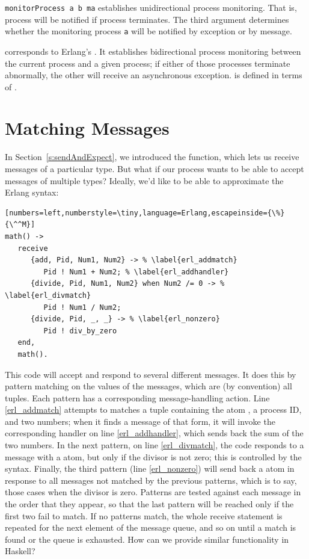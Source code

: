 \documentclass[preprint]{sigplanconf}
\begin{document}
\noindent
\lstinline!monitorProcess a b ma! establishes unidirectional process monitoring. That is, process  will be notified if process  terminates. The third argument determines whether the monitoring process \texttt{a} will be notified by exception or by message.

 corresponds to Erlang's . It establishes bidirectional process monitoring between the current process and a given process; if either of those processes terminate abnormally, the other will receive an asynchronous exception.  is defined in terms of . 

\section{Matching Messages}
\label{s:matching}

In Section~\ref{s:sendAndExpect}, we introduced the  function, which lets us receive messages of a particular type. But what if our process wants to be able to accept messages of multiple types? Ideally, we'd like to be able to approximate the Erlang  syntax:
\needspace{10ex}
\begin{lstlisting}[numbers=left,numberstyle=\tiny,language=Erlang,escapeinside={\%}{\^^M}]
math() ->
   receive
      {add, Pid, Num1, Num2} -> % \label{erl_addmatch}
         Pid ! Num1 + Num2; % \label{erl_addhandler}
      {divide, Pid, Num1, Num2} when Num2 /= 0 -> % \label{erl_divmatch}
         Pid ! Num1 / Num2;
      {divide, Pid, _, _} -> % \label{erl_nonzero}
         Pid ! div_by_zero
   end,
   math().
\end{lstlisting}
\label{erl_math}

This code will accept and respond to several different messages. It does this by pattern matching on the values of the messages, which are (by convention) all tuples. Each pattern has a corresponding message-handling action. 
Line \ref{erl_addmatch} attempts to matches a tuple containing the atom , a process ID, and two numbers; when it finds a message of that form, it will invoke the corresponding handler on line \ref{erl_addhandler}, which sends back the sum of the two numbers. 
In the next pattern, on line \ref{erl_divmatch}, the code responds to a message with a  atom, but only if the divisor is not zero; this is controlled by the  syntax. 
Finally, the third pattern (line \ref{erl_nonzero}) will send back a  atom in response to all messages not matched by the previous patterns, which is to say, those cases when the divisor is zero.
Patterns are tested against each message in the order that they appear, so that the last pattern will be reached only if the first two fail to match.
If no patterns match, the whole receive statement is repeated for the next element of the message queue, and so on until a match is found or the queue is exhausted.
How can we provide similar functionality in Haskell?
\end{document}
